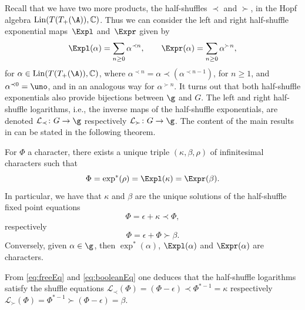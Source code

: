 Recall that we have two more products, the half-shuffles $\prec$ and $\succ$, in the Hopf algebra $\operatorname{Lin}(T(T_+(\A)),\mathbb{C})$. Thus we can consider the left and right half-shuffle exponential maps~$\Expl$ and~$\Expr$ given by
\begin{gather*}
	\Expl(\alpha)
	= \sum_{n\geq0} \alpha^{\prec n},\qquad
	\Expr(\alpha)
	= \sum_{n\geq0} \alpha^{\succ n},
\end{gather*}
for $\alpha\in \operatorname{Lin}(T(T_+(\A)),\mathbb{C})$, where $\alpha^{\prec n} = \alpha \prec (\alpha^{\prec n-1})$, for $n\geq1$, and $\alpha^{\prec 0} = \uno$, and in an analogous way for $\alpha^{\succ n}$. It turns out that both half-shuffle exponentials also provide bijections between $\g$ and $G$. The left and right half-shuffle logarithms, i.e., the inverse maps of the half-shuffle exponentials, are denoted $\mathcal{L}_\prec\colon G \to \g$ respectively $\mathcal{L}_\succ\colon G \to \g$. The content of the main results in \cite{EFP1,EFP3} can be stated in the following theorem.

\begin{Theorem}\label{thm:basicEFP}
For $\Phi$ a character, there exists a unique triple $(\kappa,\beta,\rho)$ of infinitesimal characters such that
\begin{equation}\label{eq:shuffleMCRel}
	\Phi = \exp^*(\rho) = \Expl(\kappa) = \Expr(\beta).
\end{equation}
In particular, we have that $\kappa$ and $\beta$ are the unique solutions of the half-shuffle fixed point equations
\begin{equation}\label{eq:freeEq}
	\Phi = \epsilon + \kappa\prec \Phi,
\end{equation}
respectively
\begin{equation}\label{eq:booleanEq}
	\Phi = \epsilon +\Phi\succ \beta.
\end{equation}
Conversely, given $\alpha\in \g$, then $\exp^*(\alpha)$, $\Expl(\alpha)$ and $\Expr(\alpha)$ are characters.
\end{Theorem}

From \eqref{eq:freeEq} and \eqref{eq:booleanEq} one deduces that the half-shuffle logarithms satisfy the shuffle equations $\mathcal{L}_\prec(\Phi)=(\Phi-\epsilon) \prec\Phi^{*-1}=\kappa$ respectively $\mathcal{L}_\succ(\Phi)=\Phi^{*-1} \succ (\Phi-\epsilon)=\beta$.

